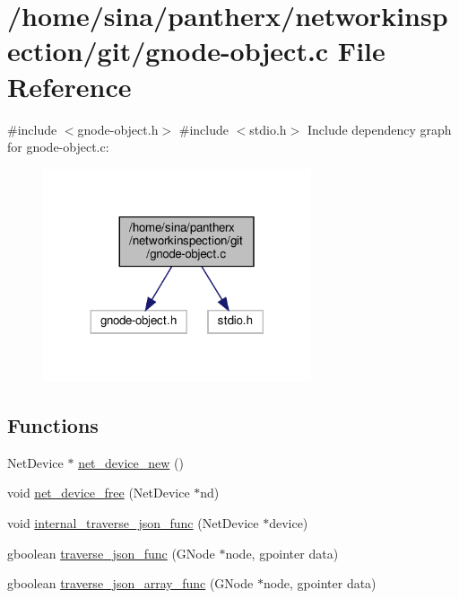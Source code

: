 \hypertarget{gnode-object_8c}{}\section{/home/sina/pantherx/networkinspection/git/gnode-\/object.c File Reference}
\label{gnode-object_8c}
{\ttfamily \#include $<$gnode-\/object.\+h$>$}\newline
{\ttfamily \#include $<$stdio.\+h$>$}\newline
Include dependency graph for gnode-\/object.c\+:\nopagebreak
\begin{figure}[H]
\begin{center}
\leavevmode
\includegraphics[width=224pt]{gnode-object_8c__incl}
\end{center}
\end{figure}
\subsection*{Functions}
\begin{DoxyCompactItemize}
\item 
Net\+Device $\ast$ \hyperlink{gnode-object_8c_ae666b3f20895e60917e691c81d464235}{net\+\_\+device\+\_\+new} ()
\item 
void \hyperlink{gnode-object_8c_af75477fcbe781bc0b17c75c1ad6d1606}{net\+\_\+device\+\_\+free} (Net\+Device $\ast$nd)
\item 
void \hyperlink{gnode-object_8c_a37bf3d0e5222ef4eeda3b40df60a1812}{internal\+\_\+traverse\+\_\+json\+\_\+func} (Net\+Device $\ast$device)
\item 
gboolean \hyperlink{gnode-object_8c_acde5d3e413f355d1b912f0dcb9d4cdc1}{traverse\+\_\+json\+\_\+func} (G\+Node $\ast$node, gpointer data)
\item 
gboolean \hyperlink{gnode-object_8c_a0d906716c0b2c59e34bff01153dc23d2}{traverse\+\_\+json\+\_\+array\+\_\+func} (G\+Node $\ast$node, gpointer data)
\end{DoxyCompactItemize}


